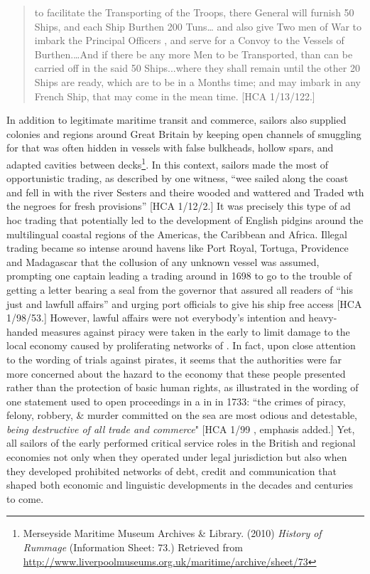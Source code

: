 \begin{quotation}
to facilitate the Transporting of the Troops, there General will furnish 50 Ships, and each Ship Burthen 200 Tuns… and also give Two men of War to imbark the Principal Officers , and serve for a Convoy to the Vessels of Burthen.…And if there be any more Men to be Transported, than can be carried off in the said 50 Ships...where they shall remain until the other 20 Ships are ready, which are to be in a Months time; and may imbark in any French Ship, that may come in the mean time. [HCA 1/13/122.]
\end{quotation}

In addition to legitimate maritime transit and commerce, sailors also supplied colonies and regions around Great Britain by keeping open channels of smuggling for  that was often hidden in vessels with false bulkheads, hollow spars, and adapted cavities between decks\footnote{Merseyside Maritime Museum Archives \& Library. (2010)  \textit{History of Rummage} (Information Sheet: 73.) Retrieved from \url{http://www.liverpoolmuseums.org.uk/maritime/archive/sheet/73}}. In this context, sailors made the most of opportunistic trading, as described by one witness, “wee sailed along the coast and fell in with the river Sesters and theire wooded and wattered and Traded wth the negroes for fresh provisions” [HCA 1/12/2.] It was precisely this type of ad hoc trading that potentially led to the development of English pidgins around the multilingual coastal regions of the Americas, the Caribbean and Africa. Illegal trading became so intense around  havens like Port Royal, Tortuga, Providence and Madagascar that the collusion of any unknown vessel was assumed, prompting one captain leading a trading  around  in 1698 to go to the trouble of getting a letter bearing a seal from the governor that assured all readers of “his just and lawfull affairs” and urging port officials to give his ship free access [HCA 1/98/53.] However, lawful affairs were not everybody’s intention and heavy-handed measures against piracy were taken in the early  to limit damage to the local economy caused by proliferating networks of . In fact, upon close attention to the wording of trials against pirates, it seems that the authorities were far more concerned about the hazard to the economy that these people presented rather than the protection of basic human rights, as illustrated in the wording of one statement used to open proceedings in a  in  in 1733: “the crimes of piracy, felony, robbery, \& murder committed on the sea are most odious and detestable, \textit{being destructive of all trade and commerce}" [HCA 1/99 \citealt{Barbados1733}, emphasis added.] Yet, all sailors of the early  performed critical service roles in the British and regional economies not only when they operated under legal jurisdiction but also when they developed prohibited networks of debt, credit and communication that shaped both economic and linguistic developments in the decades and centuries to come. 

